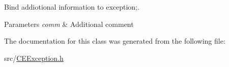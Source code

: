 Bind addiotional information to exception;. 


\begin{DoxyParams}{Parameters}
{\em comm} & Additional comment \\
\hline
\end{DoxyParams}


The documentation for this class was generated from the following file:\begin{DoxyCompactItemize}
\item 
src/\hyperlink{CEException_8h}{CEException.h}\end{DoxyCompactItemize}
